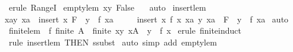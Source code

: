 \begin{isabellebody}
\isamarkupfalse%
\ {\isacharparenleft}erule\ RangeI{\isacharparenright}\isanewline
{}\isamarkupfalse%
%
\endisatagproof
{\isafoldproof}%
%
\isadelimproof
\isanewline
%
\endisadelimproof
\isanewline
{}\isamarkupfalse%
\ empty{}{\isacharunderscore}lem{\isacharcolon}\ {\isachardoublequoteopen}{\isacharbraceleft}{\isacharparenleft}x{\isacharcomma}y{\isacharparenright}{\isachardot}\ False{\isacharbraceright}\ {\isacharequal}\ {\isacharbraceleft}{\isacharbraceright}{\isachardoublequoteclose}\isanewline
%
\isadelimproof
%
\endisadelimproof
%
\isatagproof
{}\isamarkupfalse%
\ auto\isanewline
{}\isamarkupfalse%
%
\endisatagproof
{\isafoldproof}%
%
\isadelimproof
\isanewline
%
\endisadelimproof
\isanewline
{}\isamarkupfalse%
\ insert{\isacharunderscore}lem{\isacharcolon}\ \isanewline
{\isachardoublequoteopen}{\isacharbraceleft}{\isacharparenleft}xa{\isacharcomma}y{\isacharparenright}{\isachardot}\ xa\ {\isacharcolon}\ insert\ x\ F\ {\isacharampersand}\ y\ {\isacharequal}\ f\ xa{\isacharbraceright}\ {\isacharequal}\ \ \isanewline
\ \ insert\ {\isacharparenleft}x{\isacharcomma}\ f\ x{\isacharparenright}\ {\isacharbraceleft}{\isacharparenleft}xa{\isacharcomma}\ y{\isacharparenright}{\isachardot}\ xa\ {\isacharcolon}\ F\ {\isacharampersand}\ y\ {\isacharequal}\ f\ xa{\isacharbraceright}{\isachardoublequoteclose}\isanewline
%
\isadelimproof
%
\endisadelimproof
%
\isatagproof
{}\isamarkupfalse%
\ auto\isanewline
{}\isamarkupfalse%
%
\endisatagproof
{\isafoldproof}%
%
\isadelimproof
\isanewline
%
\endisadelimproof
\isanewline
{}\isamarkupfalse%
\ finite{\isacharunderscore}lem{\isacharcolon}\ {\isachardoublequoteopen}{\isacharbang}{\isacharbang}\ f{\isachardot}\ finite\ A\ {\isacharequal}{\isacharequal}{\isachargreater}\ finite\ {\isacharbraceleft}{\isacharparenleft}x{\isacharcomma}y{\isacharparenright}{\isachardot}\ x{\isacharcolon}A\ {\isacharampersand}\ y\ {\isacharequal}\ f\ x{\isacharbraceright}{\isachardoublequoteclose}\isanewline
%
\isadelimproof
%
\endisadelimproof
%
\isatagproof
{}\isamarkupfalse%
\ {\isacharparenleft}erule\ finite{\isacharunderscore}induct{\isacharparenright}\isanewline
{}\isamarkupfalse%
\ {}\isanewline
{}\isamarkupfalse%
\ {\isacharparenleft}rule\ insert{\isacharunderscore}lem\ {\isacharbrackleft}THEN\ ssubst{\isacharbrackright}{\isacharparenright}\isanewline
{}\isamarkupfalse%
\ {\isacharparenleft}auto\ simp\ add{\isacharcolon}\ empty{}{\isacharunderscore}lem{\isacharparenright}\isanewline

\end{isabellebody}
